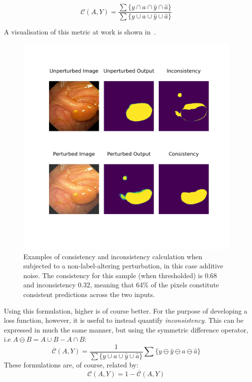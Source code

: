 \begin{equation}
    \mathcal{C}(A,Y) = \frac{\sum\{y \cap a \cap \hat{y} \cap \hat{a} \}}
    {\sum\{ y \cup a \cup \hat{y} \cup \hat{a} \}}
\end{equation}

A visualisation of this metric at work is shown in~.

\begin{figure}[htb]
    \centering
    \includegraphics[width=\linewidth]{illustrations/consistency_examples.png}
    \caption[Segmentation Consistency Visualization 1]{Examples of consistency and inconsistency calculation when subjected to a non-label-altering perturbation, in this case additive noise. The consistency for this sample (when thresholded) is 0.68 and inconsistency 0.32, meaning that 64\% of the pixels constitute consistent predictions across the two inputs.}
    \label{fig:consistency_example}
\end{figure}

Using this formulation, higher is of course better. For the purpose of developing a loss function, however, it is useful to instead quantify \textit{inconsistency}. This can be expressed in much the same manner, but using the symmetric difference operator, i.e \(A \ominus B = A \cup B - A \cap B\): 
\begin{equation}\label{eq:inconsistency}
    \overline{\mathcal{C}}(A,Y) = \frac{1}{\sum\{y \cup a \cup \hat{y} \cup \hat{a} \}} \sum \{y\ominus\hat{y}\ominus a\ominus\hat{a}\}
\end{equation}
These formulations are, of course, related by:
\begin{equation*}
    \mathcal{C}(A,Y) = 1-\overline{\mathcal{C}}(A,Y)
\end{equation*}

